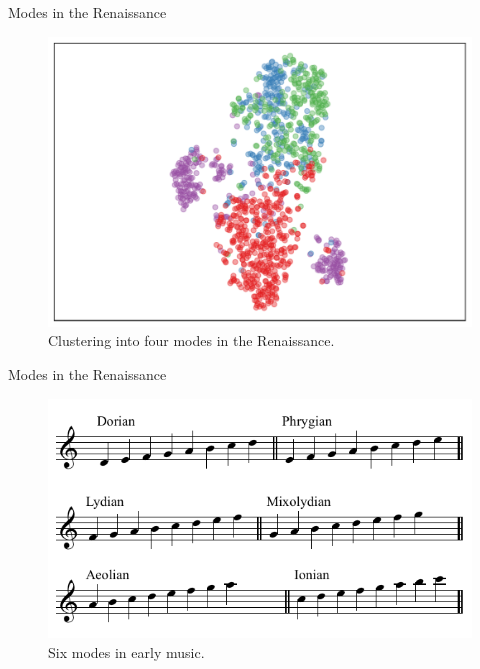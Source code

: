 \begin{frame}{Modes in the Renaissance}
    \begin{figure}
        \centering
        \includegraphics[width=\linewidth,height=.7\textheight,keepaspectratio]{_images/Figure6.pdf}
        \caption{Clustering into four modes in the Renaissance.}
    \end{figure}
\end{frame}

\begin{frame}{Modes in the Renaissance}
    \begin{figure}
        \centering
        \includegraphics[width=.6\linewidth]{_images/renaissance_modes.png}
        \caption{Six modes in early music.}
    \end{figure}
\end{frame}

